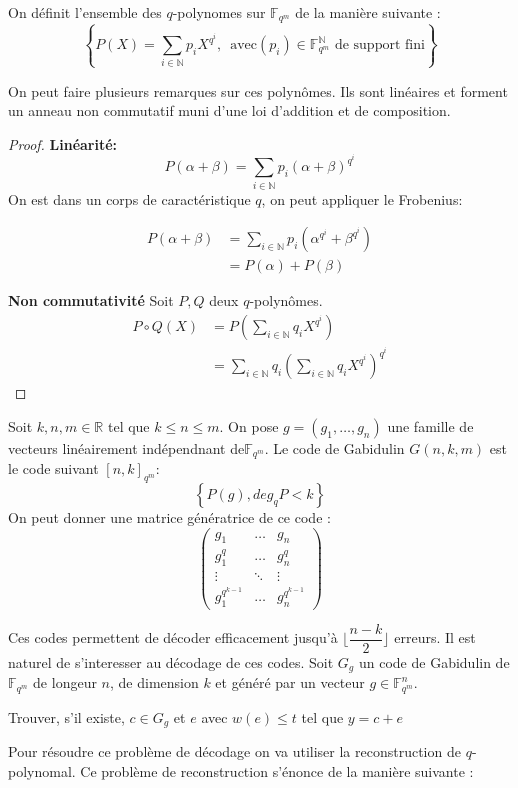 \documentclass[12pt]{article}
\begin{document}
\begin{defi}
On définit l'ensemble des $q$-polynomes sur $\mathbb{F}_{q^m}$ de la manière suivante :
$$ \left\{ P(X)=\sum_{i \in \mathbb{N}} p_iX^{q^i} ,\, \text{ avec} (p_i) \in \mathbb{F}_{q^m}^{\mathbb{N}} \text{ de support fini}   \right\}$$
\end{defi}
On peut faire plusieurs remarques sur ces polynômes. Ils sont linéaires et forment un anneau non commutatif muni d'une loi d'addition et de composition.

\begin{proof}
\textbf{Linéarité:}
$$P(\alpha + \beta) = \sum_{i \in \mathbb{N}} p_i(\alpha +\beta)^{q^i}$$
On est dans un corps de caractéristique $q$, on peut appliquer le Frobenius:

\begin{align*}
P(\alpha + \beta) &= \sum_{i \in \mathbb{N}} p_i(\alpha^{q^i} +\beta^{q^i}) \\
 &= P(\alpha) + P(\beta)
\end{align*}

\textbf{Non commutativité}
Soit $P,Q$ deux $q$-polynômes.
\begin{align*}
 P \circ Q (X) &= P(\sum_{i \in \mathbb{N}} q_iX^{q^i}) \\
  &= \sum_{i \in \mathbb{N}} q_i(\sum_{i \in \mathbb{N}} q_iX^{q^i})^{q^i}
\end{align*}

\end{proof}
\begin{defi}
Soit $k,n,m \in \mathbb{R}$ tel que $k \leq n \leq m$. On pose $g=(g_1, \ldots, g_n)$ une famille de vecteurs linéairement indépendnant de$\mathbb{F}_{q^m}$. Le code de Gabidulin $G(n,k,m)$ est le code suivant $[n,k]_{q^m}$:
$$\left\{ P(g), deg_qP < k\right\}$$
\newline
On peut donner une matrice génératrice de ce code :
\newline
$$
\begin{pmatrix}
g_1 & \ldots & g_n \\
g_1^q & \ldots & g_n^q \\
\vdots & \ddots & \vdots \\
g_1^{q^{k-1}} & \ldots & g_n^{q^{k-1}}
\end{pmatrix}
$$
\end{defi}
Ces codes permettent de décoder efficacement jusqu'à $\lfloor\dfrac{n-k}{2}\rfloor$ erreurs. Il est naturel de s'interesser au décodage de ces codes.
Soit $G_g$ un code de Gabidulin de $\mathbb{F}_{q^m}$ de longeur $n$, de dimension $k$ et généré par un vecteur $g \in \mathbb{F}_{q^m}^n$.
\begin{defi}[Decoding$(y,G_g,t)$]
Trouver, s'il existe, $c \in G_g$ et $e$ avec $w(e) \leq t$ tel que $y = c + e$
\end{defi}
Pour résoudre ce problème de décodage on va utiliser la reconstruction de $q$-polynomal. Ce problème de reconstruction s'énonce de la manière suivante :
\end{document}
